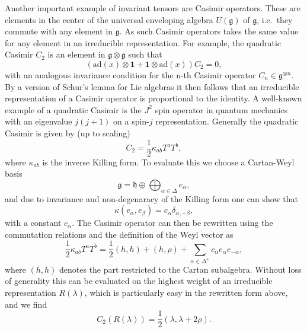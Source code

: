 Another important example of invariant tensors are Casimir operators. These are elements in the center of the universal enveloping algebra $U(\mathfrak{g})$ of $\mathfrak{g}$, i.e.\ they commute with any element in $\mathfrak{g}$. As such Casimir operators takes the same value for any element in an irreducible representation. For example, the quadratic Casimir $C_2$ is an element in $\mathfrak{g}\otimes\mathfrak{g}$ such that 
\begin{equation}
    \left(\text{ad}(x)\otimes\mathbf{1}+\mathbf{1}\otimes\text{ad}(x)\right)C_2 = 0,
\end{equation}
with an analogous invariance condition for the n-th Casimir operator $C_n\in\mathfrak{g}^{\otimes n}$. By a version of Schur's lemma for Lie algebras it then follows that an irreducible representation of a Casimir operator is proportional to the identity. A well-known example of a quadratic Casimir is the $J^2$ spin operator in quantum mechanics with an eigenvalue $j(j+1)$ on a spin-$j$ representation. Generally the quadratic Casimir is given by (up to scaling)
\begin{equation}
    C_2 = \frac{1}{2}\kappa_{ab}T^aT^b,
\end{equation}
where $\kappa_{ab}$ is the inverse Killing form. To evaluate this we choose a Cartan-Weyl basis 
\begin{equation}
    \mathfrak{g} = \mathfrak{h} \oplus\bigoplus_{\alpha\in\Delta} e_\alpha, 
\end{equation}
and due to invariance and non-degenaracy of the Killing form one can show that
\begin{equation}
    \kappa(e_\alpha,e_\beta) = c_\alpha\delta_{\alpha,-\beta},
\end{equation}
with a constant $c_\alpha$. The Casimir operator can then be rewritten using the commutation relations and the definition of the Weyl vector as 
\begin{equation}\label{eq:DefCasimir}
    \frac{1}{2}\kappa_{ab}T^aT^b = \frac{1}{2}(h,h)+(h,\rho)+\sum_{\alpha\in\Delta^+}c_\alpha e_{\alpha}e_{-\alpha},
\end{equation}
where $(h,h)$ denotes the part restricted to the Cartan subalgebra. Without loss of generality this can be evaluated on the highest weight of an irreducible representation $R(\lambda)$, which is particularly easy in the rewritten form above, and we find
\begin{equation}\label{eq:Casimir}
    C_2(R(\lambda)) = \frac{1}{2}(\lambda,\lambda+2\rho).
\end{equation}


